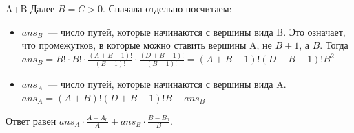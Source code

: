 \begin{tutorial}{A+B}
Далее $B=C>0$. Сначала отдельно посчитаем:
\begin{itemize}
\item $ans_B$~--- число путей, которые начинаются с вершины вида B. Это означает, что промежутков, в которые можно ставить вершины A, не $B+1$, а $B$. Тогда $ans_B=B! \cdot B! \cdot \frac{(A+B-1)!}{(B-1)!} \cdot \frac{(D+B-1)!}{(B-1)!} = (A+B-1)!(D+B-1)!B^2$
\item $ans_A$~--- число путей, которые начинаются с вершины вида A. $ans_A = (A+B)!(D+B-1)!B-ans_B$
\end{itemize}

Ответ равен $ans_A \cdot \frac{A-A_0}{A} + ans_B \cdot \frac{B-B_0}{B}$.

\end{tutorial}
